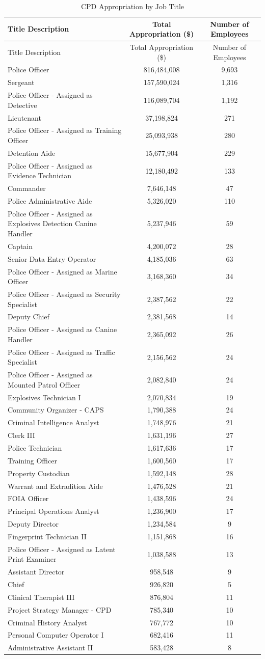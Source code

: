 \documentclass[
]{article}
\begin{document}
\begin{longtable}[]{@{}lcc@{}}
\caption{CPD Appropriation by Job Title}\tabularnewline
\toprule
Title Description & Total Appropriation (\$) & Number of
Employees\tabularnewline
\midrule
\endfirsthead
\toprule
Title Description & Total Appropriation (\$) & Number of
Employees\tabularnewline
\midrule
\endhead
Police Officer & 816,484,008 & 9,693\tabularnewline
Sergeant & 157,590,024 & 1,316\tabularnewline
Police Officer - Assigned as Detective & 116,089,704 &
1,192\tabularnewline
Lieutenant & 37,198,824 & 271\tabularnewline
Police Officer - Assigned as Training Officer & 25,093,938 &
280\tabularnewline
Detention Aide & 15,677,904 & 229\tabularnewline
Police Officer - Assigned as Evidence Technician & 12,180,492 &
133\tabularnewline
Commander & 7,646,148 & 47\tabularnewline
Police Administrative Aide & 5,326,020 & 110\tabularnewline
Police Officer - Assigned as Explosives Detection Canine Handler &
5,237,946 & 59\tabularnewline
Captain & 4,200,072 & 28\tabularnewline
Senior Data Entry Operator & 4,185,036 & 63\tabularnewline
Police Officer - Assigned as Marine Officer & 3,168,360 &
34\tabularnewline
Police Officer - Assigned as Security Specialist & 2,387,562 &
22\tabularnewline
Deputy Chief & 2,381,568 & 14\tabularnewline
Police Officer - Assigned as Canine Handler & 2,365,092 &
26\tabularnewline
Police Officer - Assigned as Traffic Specialist & 2,156,562 &
24\tabularnewline
Police Officer - Assigned as Mounted Patrol Officer & 2,082,840 &
24\tabularnewline
Explosives Technician I & 2,070,834 & 19\tabularnewline
Community Organizer - CAPS & 1,790,388 & 24\tabularnewline
Criminal Intelligence Analyst & 1,748,976 & 21\tabularnewline
Clerk III & 1,631,196 & 27\tabularnewline
Police Technician & 1,617,636 & 17\tabularnewline
Training Officer & 1,600,560 & 17\tabularnewline
Property Custodian & 1,592,148 & 28\tabularnewline
Warrant and Extradition Aide & 1,476,528 & 21\tabularnewline
FOIA Officer & 1,438,596 & 24\tabularnewline
Principal Operations Analyst & 1,236,900 & 17\tabularnewline
Deputy Director & 1,234,584 & 9\tabularnewline
Fingerprint Technician II & 1,151,868 & 16\tabularnewline
Police Officer - Assigned as Latent Print Examiner & 1,038,588 &
13\tabularnewline
Assistant Director & 958,548 & 9\tabularnewline
Chief & 926,820 & 5\tabularnewline
Clinical Therapist III & 876,804 & 11\tabularnewline
Project Strategy Manager - CPD & 785,340 & 10\tabularnewline
Criminal History Analyst & 767,772 & 10\tabularnewline
Personal Computer Operator I & 682,416 & 11\tabularnewline
Administrative Assistant II & 583,428 & 8\tabularnewline

\end{longtable}
\end{document}
